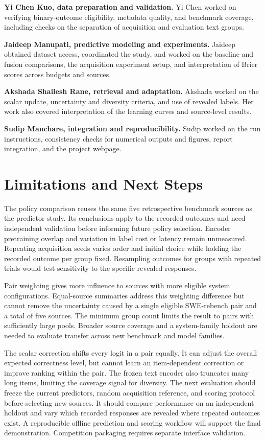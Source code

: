 \documentclass[conference]{IEEEtran}
\begin{document}
\textbf{Yi Chen Kuo, data preparation and validation.} Yi Chen worked on verifying binary-outcome eligibility, metadata quality, and benchmark coverage, including checks on the separation of acquisition and evaluation text groups.

\textbf{Jaideep Manupati, predictive modeling and experiments.} Jaideep obtained dataset access, coordinated the study, and worked on the baseline and fusion comparisons, the acquisition experiment setup, and interpretation of Brier scores across budgets and sources.

\textbf{Akshada Shailesh Rane, retrieval and adaptation.} Akshada worked on the scalar update, uncertainty and diversity criteria, and use of revealed labels. Her work also covered interpretation of the learning curves and source-level results.

\textbf{Sudip Manchare, integration and reproducibility.} Sudip worked on the run instructions, consistency checks for numerical outputs and figures, report integration, and the project webpage.

\section{Limitations and Next Steps}
The policy comparison reuses the same five retrospective benchmark sources as the predictor study. Its conclusions apply to the recorded outcomes and need independent validation before informing future policy selection. Encoder pretraining overlap and variation in label cost or latency remain unmeasured. Repeating acquisition seeds varies order and initial choice while holding the recorded outcome per group fixed. Resampling outcomes for groups with repeated trials would test sensitivity to the specific revealed responses.

Pair weighting gives more influence to sources with more eligible system configurations. Equal-source summaries address this weighting difference but cannot remove the uncertainty caused by a single eligible SWE-rebench pair and a total of five sources. The minimum group count limits the result to pairs with sufficiently large pools. Broader source coverage and a system-family holdout are needed to evaluate transfer across new benchmark and model families.

The scalar correction shifts every logit in a pair equally. It can adjust the overall expected correctness level, but cannot learn an item-dependent correction or improve ranking within the pair. The frozen text encoder also truncates many long items, limiting the coverage signal for diversity. The next evaluation should freeze the current predictors, random acquisition reference, and scoring protocol before selecting new sources. It should compare performance on an independent holdout and vary which recorded responses are revealed where repeated outcomes exist. A reproducible offline prediction and scoring workflow will support the final demonstration. Competition packaging requires separate interface validation.
\end{document}
